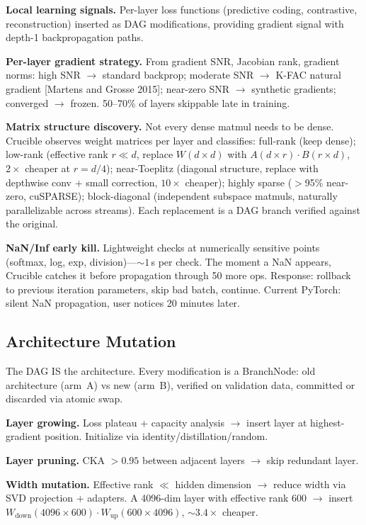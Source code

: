 \textbf{Local learning signals.}
Per-layer loss functions (predictive coding, contrastive, reconstruction) inserted as DAG modifications, providing gradient signal with depth-1 backpropagation paths.

\textbf{Per-layer gradient strategy.}
From gradient SNR, Jacobian rank, gradient norms: high SNR $\to$ standard backprop; moderate SNR $\to$ K-FAC natural gradient [Martens and Grosse 2015]; near-zero SNR $\to$ synthetic gradients; converged $\to$ frozen.
50--70\% of layers skippable late in training.

\textbf{Matrix structure discovery.}
Not every dense matmul needs to be dense.
Crucible observes weight matrices per layer and classifies: full-rank (keep dense); low-rank (effective rank $r \ll d$, replace $W(d{\times}d)$ with $A(d{\times}r) \cdot B(r{\times}d)$, $2\times$ cheaper at $r = d/4$); near-Toeplitz (diagonal structure, replace with depthwise conv + small correction, $10\times$ cheaper); highly sparse ($>$95\% near-zero, cuSPARSE); block-diagonal (independent subspace matmuls, naturally parallelizable across streams).
Each replacement is a DAG branch verified against the original.

\textbf{NaN/Inf early kill.}
Lightweight  checks at numerically sensitive points (softmax, log, exp, division)---${\sim}1$\,\textmu{}s per check.
The moment a NaN appears, Crucible catches it before propagation through 50 more ops.
Response: rollback to previous iteration parameters, skip bad batch, continue.
Current PyTorch: silent NaN propagation, user notices 20 minutes later.

\subsection{Architecture Mutation}

The DAG IS the architecture.
Every modification is a BranchNode: old architecture (arm~A) vs new (arm~B), verified on validation data, committed or discarded via atomic swap.

\textbf{Layer growing.}
Loss plateau + capacity analysis $\to$ insert layer at highest-gradient position.
Initialize via identity/distillation/random.

\textbf{Layer pruning.}
CKA $> 0.95$ between adjacent layers $\to$ skip redundant layer.

\textbf{Width mutation.}
Effective rank $\ll$ hidden dimension $\to$ reduce width via SVD projection + adapters.
A 4096-dim layer with effective rank 600 $\to$ insert $W_\text{down}(4096{\times}600) \cdot W_\text{up}(600{\times}4096)$, ${\sim}3.4\times$ cheaper.

